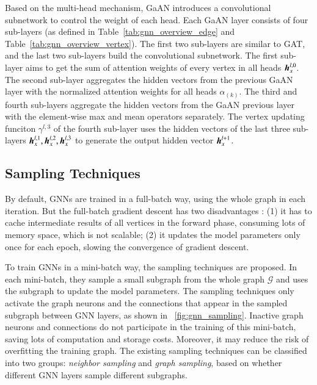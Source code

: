 Based on the multi-head mechanism, GaAN \cite{zhang2018_gaan} introduces a convolutional subnetwork to control the weight of each head.
%
Each GaAN layer consists of four sub-layers (as defined in Table~\ref{tab:gnn_overview_edge} and Table~\ref{tab:gnn_overview_vertex}).
%
The first two sub-layers are similar to GAT, and the last two sub-layers build the convolutional subnetwork.
%
The first sub-layer aims to get the sum of attention weights of every vertex in all heads $\boldsymbol{h}^{l,0}_x$.
The second sub-layer aggregates the hidden vectors from the previous GaAN layer with the normalized attention weights for all heads $\alpha_{(k)}$.
The third and fourth sub-layers aggregate the hidden vectors from the GaAN previous layer with the element-wise max and mean operators separately.
The vertex updating funciton $\gamma^{l,3}$ of the fourth sub-layer uses the hidden vectors of the last three sub-layers $\boldsymbol{h}^{l, 1}_x, \boldsymbol{h}^{l, 2}_x, \boldsymbol{h}^{l, 3}_x$ to generate the output hidden vector $\boldsymbol{h}^{l+1}_x$.

\subsection{Sampling Techniques}

By default, GNNs are trained in a full-batch way, using the whole graph in each iteration.
%
But the full-batch gradient descent has two disadvantages \cite{chiang2019_cluster_gcn}:
%
(1) it has to cache intermediate results of all vertices in the forward phase, consuming lots of memory space, which is not scalable;
%
(2) it updates the model parameters only once for each epoch, slowing the convergence of gradient descent.

To train GNNs in a mini-batch way, the sampling techniques \cite{hamilton2017_graphsage, ying2018_pinsage, chen2018_fastgcn, chen2018_sgcn, zeng2018_aesg, chiang2019_cluster_gcn, zeng2020_graphsaint} are proposed.
%
In each mini-batch, they sample a small subgraph from the whole graph $\mathcal{G}$ and uses the subgraph to update the model parameters.
%
The sampling techniques only activate the graph neurons and the connections that appear in the sampled subgraph between GNN layers, as shown in \figurename~\ref{fig:gnn_sampling}.
%
Inactive graph neurons and connections do not participate in the training of this mini-batch, saving lots of computation and storage costs.
%
Moreover, it may reduce the risk of overfitting the training graph.
%
The existing sampling techniques can be classified into two groups: \emph{neighbor sampling} and \emph{graph sampling}, based on whether different GNN layers sample different subgraphs.

